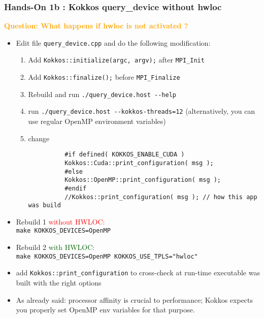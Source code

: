   
\begin{frame}[fragile=singleslide]
  \frametitle{Hands-On 1b : Kokkos query\_device without hwloc}

  {\large\textcolor{orange}{\bf Question: What happens if hwloc is not activated ?}}

  \begin{itemize}
  \item Edit file \texttt{query\_device.cpp} and do the following modification:
    \begin{enumerate}
    \item Add \texttt{Kokkos::initialize(argc, argv);} after \texttt{MPI\_Init}
    \item Add \texttt{Kokkos::finalize();} before \texttt{MPI\_Finalize}
    \item Rebuild and run \texttt{./query\_device.host \--\--help}
    \item run \texttt{./query\_device.host \--\--kokkos-threads=12} (alternatively, you can use regular OpenMP environment variables)
    \item change\\
      {\small
        \begin{verbatim}
          #if defined( KOKKOS_ENABLE_CUDA )
          Kokkos::Cuda::print_configuration( msg );
          #else
          Kokkos::OpenMP::print_configuration( msg );
          #endif
          //Kokkos::print_configuration( msg ); // how this app was build
        \end{verbatim}
      }
    \end{enumerate}
  \item {\small Rebuild 1 \textcolor{red}{without HWLOC:}\\
      \texttt{make KOKKOS\_DEVICES=OpenMP}}
  \item {\small Rebuild 2 \textcolor{darkgreen}{with HWLOC:}\\
      \texttt{make KOKKOS\_DEVICES=OpenMP KOKKOS\_USE\_TPLS="hwloc"}}
  \item add \texttt{Kokkos::print\_configuration} to cross-check at run-time executable was built with the right options
  \item As already said: processor affinity is crucial to performance; Kokkos expects you properly set OpenMP env variables for that purpose.
  \end{itemize}

\end{frame}
